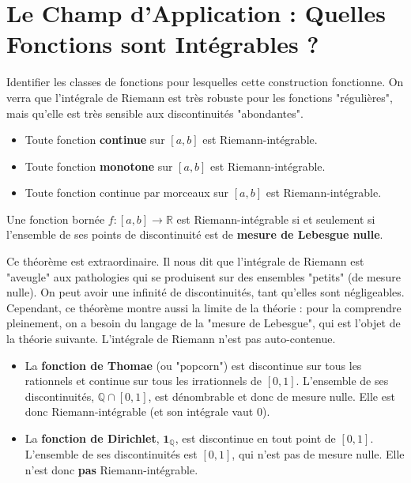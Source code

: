 \section{Le Champ d'Application : Quelles Fonctions sont Intégrables ?}

\begin{objectif}
    Identifier les classes de fonctions pour lesquelles cette construction fonctionne. On verra que l'intégrale de Riemann est très robuste pour les fonctions "régulières", mais qu'elle est très sensible aux discontinuités "abondantes".
\end{objectif}

\begin{theorem}
    \begin{itemize}
        \item Toute fonction \textbf{continue} sur $[a,b]$ est Riemann-intégrable.
        \item Toute fonction \textbf{monotone} sur $[a,b]$ est Riemann-intégrable.
        \item Toute fonction continue par morceaux sur $[a,b]$ est Riemann-intégrable.
    \end{itemize}
\end{theorem}

\begin{theorem}
    Une fonction bornée $f: [a,b] \to \mathbb{R}$ est Riemann-intégrable si et seulement si l'ensemble de ses points de discontinuité est de \textbf{mesure de Lebesgue nulle}.
\end{theorem}

\begin{remark}
    Ce théorème est extraordinaire. Il nous dit que l'intégrale de Riemann est "aveugle" aux pathologies qui se produisent sur des ensembles "petits" (de mesure nulle). On peut avoir une infinité de discontinuités, tant qu'elles sont négligeables.
    Cependant, ce théorème montre aussi la limite de la théorie : pour la comprendre pleinement, on a besoin du langage de la "mesure de Lebesgue", qui est l'objet de la théorie suivante. L'intégrale de Riemann n'est pas auto-contenue.
\end{remark}

\begin{example}
    \begin{itemize}
        \item La \textbf{fonction de Thomae} (ou "popcorn") est discontinue sur tous les rationnels et continue sur tous les irrationnels de $[0,1]$. L'ensemble de ses discontinuités, $\mathbb{Q} \cap [0,1]$, est dénombrable et donc de mesure nulle. Elle est donc Riemann-intégrable (et son intégrale vaut 0).
        \item La \textbf{fonction de Dirichlet}, $\mathbf{1}_{\mathbb{Q}}$, est discontinue en tout point de $[0,1]$. L'ensemble de ses discontinuités est $[0,1]$, qui n'est pas de mesure nulle. Elle n'est donc \textbf{pas} Riemann-intégrable.
    \end{itemize}
\end{example}

